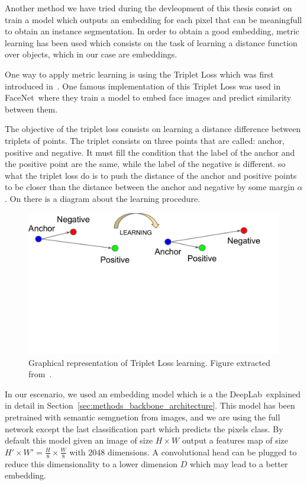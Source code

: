 Another method we have tried during the devleopment of this thesis consist on train a model which outputs an embedding for each pixel that can be meaningfull to obtain an instance segmentation.
In order to obtain a good embedding, metric learning has been used which consists on the task of learning a distance function over objects, which in our case are embeddings.

One way to apply metric learning is using the Triplet Loss which was first introduced in~\metriclearning.
One famous implementation of this Triplet Loss was used in FaceNet~\facenet where they train a model to embed face images and predict similarity between them.

The objective of the triplet loss consists on learning a distance difference between triplets of points.
The triplet consists on three points that are called: anchor, positive and negative.
It must fill the condition that the label of the anchor and the positive point are the same, while the label of the negative is different.
so what the triplet loss do is to push the distance of the anchor and positive points to be closer than the distance between the anchor and negative by some margin $\alpha$.
On  there is a diagram about the learning procedure.

\begin{figure}[h]
  \centering
  \includegraphics[trim=1cm 10cm 2.5cm 0cm, width=0.7\linewidth]{figures/methods/triplet_loss/triplet_viz.pdf}
  \caption{
    Graphical representation of Triplet Loss learning.
    Figure extracted from~\cite{schroff2015facenet}. }
  \label{fig:triplet_loss_viz}
\end{figure}

In our escenario, we used an embedding model which is a the DeepLab~\deeplab explained in detail in Section~\ref{sec:methods_backbone_architecture}.
This model has been pretrained with semantic semgnetion from images, and we are using the full network except the last classification part which predicts the pixels class.
By default this model given an image of size $H \times W$ output a features map of size $H' \times W' = \frac{H}{8} \times \frac{W}{8}$ with $2048$ dimensions.
A convolutional head can be plugged to reduce this dimensionality to a lower dimension $D$ which may lead to a better embedding.


